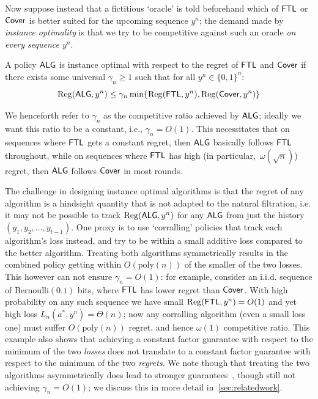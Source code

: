 Now suppose instead that a fictitious `oracle' is told beforehand which of $\mathsf{FTL}$ or $\mathsf{Cover}$ is better suited for the upcoming sequence $y^n$; the demand made by \emph{instance optimality} is that we try to be competitive against such an oracle \emph{on every sequence $y^n$}.
\begin{definition}\label{def:instanceopt_binary}
A policy $\mathsf{ALG}$ is instance optimal with respect to the regret of $\mathsf{FTL}$ and $\mathsf{Cover}$ if there exists some universal $\gamma_n \geq 1$ such that for all $y^n \in \{0,1\}^n$:
\begin{equation*}
\label{eq:instanceopt_binary}
\small \mathrm{Reg}(\mathsf{ALG},y^n)\leq \gamma_n \min\{\mathrm{Reg}(\mathsf{FTL},y^n),\mathrm{Reg}(\mathsf{Cover},y^n)\}
\end{equation*}
\end{definition}
We henceforth refer to $\gamma_n$ as the competitive ratio achieved by $\mathsf{ALG}$; ideally we want this ratio to be a constant, i.e., $\gamma_n = O(1)$. 
This necessitates that on sequences where $\mathsf{FTL}$ gets a constant regret, then $\mathsf{ALG}$ basically follows $\mathsf{FTL}$ throughout, while on sequences where $\mathsf{FTL}$ has high (in particular,~$\omega(\sqrt{n})$) regret, then $\mathsf{ALG}$ follows $\mathsf{Cover}$ in most rounds. 

The challenge in designing instance optimal algorithms is that the regret of any algorithm is a hindsight quantity that is not adapted to the natural filtration, i.e. it may not be possible to track $\mathrm{Reg}(\mathsf{ALG},y^n)$ for any $\mathsf{ALG}$ from just the history $(y_1,y_2,\ldots,y_{t-1})$. 
One proxy is to use `corralling' policies that track each algorithm's loss instead, and try to be within a small additive loss compared to the better algorithm.
Treating both algorithms symmetrically results in the combined policy getting within  $O(\text{poly}(n))$ of the smaller of the two losses. This however can not ensure $\gamma_n=O(1)$:
for example, consider an i.i.d. sequence of Bernoulli$(0.1)$ bits, where $\mathsf{FTL}$ has lower regret than $\mathsf{Cover}$. With high probability on any such sequence we have small $\mathrm{Reg}(\mathsf{FTL},y^n)=O(1)$ and yet high loss $L_n(a^*,y^n)=\Theta(n)$; now any corralling algorithm (even a small loss one) must suffer $O(\text{poly}(n))$ regret, and hence $\omega(1)$ competitive ratio. This example also shows that achieving a constant factor guarantee with respect to the minimum of the two \emph{losses} does not translate to a constant factor guarantee with respect to the minimum of the two \emph{regrets}. We note though that treating the two algorithms asymmetrically does lead to stronger guarantees~\citep{sani2014exploiting}, though still not achieving $\gamma_n=O(1)$; we discuss this in more detail in~\ref{sec:relatedwork}.

